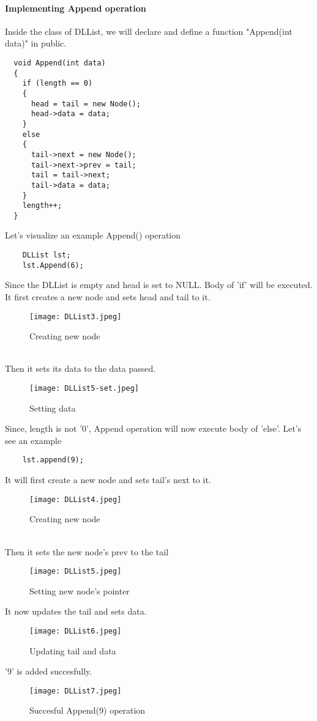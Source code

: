 \documentclass[11pt,fleqn]{book} %
\begin{document}
\paragraph{Implementing Append operation}
Inside the class of DLList, we will declare and define a function "Append(int data)" in public.
\begin{lstlisting}
  void Append(int data)
  {
    if (length == 0)
    {
      head = tail = new Node();
      head->data = data;
    }
    else
    {
      tail->next = new Node();
      tail->next->prev = tail;
      tail = tail->next;
      tail->data = data;
    }
    length++;
  }

\end{lstlisting}
\begin{example}
  Let's visualize an example Append() operation\\
  \begin{lstlisting}
    DLList lst;
    lst.Append(6);
  \end{lstlisting}
  Since the DLList is empty and head is set to NULL. Body of 'if' will be executed.\\
  It first creates a new node and sets head and tail to it.\\
  \begin{figure}[H]
    \centering
    \texttt{[image: DLList3.jpeg]}
    \caption{Creating new node}
  \end{figure}
  ~\\
  Then it sets its data to the data passed.
  \begin{figure}[H]
    \centering
    \texttt{[image: DLList5-set.jpeg]}
    \caption{Setting data}
  \end{figure}
\end{example}
Since, length is not '0', Append operation will now execute body of 'else'. Let's see an example
\begin{example}
  \begin{lstlisting}
    lst.append(9);
  \end{lstlisting}
  It will first create a new node and sets tail's next to it.
  \begin{figure}[H]
    \centering
    \texttt{[image: DLList4.jpeg]}
    \caption{Creating new node}
  \end{figure} ~\\
  Then it sets the new node's prev to the tail
  \begin{figure}[H]
    \centering
    \texttt{[image: DLList5.jpeg]}
    \caption{Setting new node's pointer}
  \end{figure}
  It now updates the tail and sets data.
  \begin{figure}[H]
    \centering
    \texttt{[image: DLList6.jpeg]}
    \caption{Updating tail and data}
  \end{figure}
  '9' is added succesfully.
  {\begin{figure}[H]
      \centering
      \texttt{[image: DLList7.jpeg]}
      \caption{Succesful Append(9) operation}
    \end{figure}}
\end{example}
\end{document}
